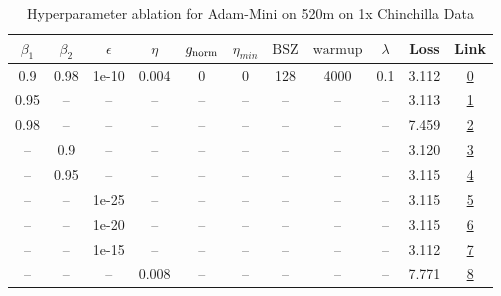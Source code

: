 \begin{table}[H]
\centering
\caption{Hyperparameter ablation for Adam-Mini on 520m on 1x Chinchilla Data}
\label{tab:ablation_adam-mini_520m_on_1x_chinchilla_data}
\begin{tabular}{ccccccccccc}
\toprule
$\beta_1$ & $\beta_2$ & $\epsilon$ & $\eta$ & $g_{\mathrm{norm}}$ & $\eta_{min}$ & $\mathrm{BSZ}$ & $\mathrm{warmup}$ & $\lambda$ & Loss & Link \\
\midrule
0.9 & 0.98 & 1e-10 & 0.004 & 0 & 0 & 128 & 4000 & 0.1 & 3.112 & \href{https://wandb.ai/marin-community/optimizer-scaling/runs/sweep-520m-10B-mini9187d7lr0.004-wd0.1-minlr0-warmup4000-b10.9-b-398e5f}{0} \\
\midrule
0.95 & -- & -- & -- & -- & -- & -- & -- & -- & 3.113 & \href{https://wandb.ai/marin-community/optimizer-scaling/runs/sweep-520m-10B-minic83515lr0.004-wd0.1-minlr0-warmup4000-b10.95--2b99be}{1} \\
0.98 & -- & -- & -- & -- & -- & -- & -- & -- & 7.459 & \href{https://wandb.ai/marin-community/optimizer-scaling/runs/sweep-520m-10B-mini61f7e6lr0.004-wd0.1-minlr0-warmup4000-b10.98--c8aa3c}{2} \\
-- & 0.9 & -- & -- & -- & -- & -- & -- & -- & 3.120 & \href{https://wandb.ai/marin-community/optimizer-scaling/runs/sweep-520m-10B-minib059b0lr0.004-wd0.1-minlr0-warmup4000-b10.9-b-ef048a}{3} \\
-- & 0.95 & -- & -- & -- & -- & -- & -- & -- & 3.115 & \href{https://wandb.ai/marin-community/optimizer-scaling/runs/sweep-520m-10B-minid80005lr0.004-wd0.1-minlr0-warmup4000-b10.9-b-4d59a5}{4} \\
-- & -- & 1e-25 & -- & -- & -- & -- & -- & -- & 3.115 & \href{https://wandb.ai/marin-community/optimizer-scaling/runs/sweep-520m-10B-mini030aa2lr0.004-wd0.1-minlr0-warmup4000-b10.9-b-e031a9}{5} \\
-- & -- & 1e-20 & -- & -- & -- & -- & -- & -- & 3.115 & \href{https://wandb.ai/marin-community/optimizer-scaling/runs/sweep-520m-10B-miniad4882lr0.004-wd0.1-minlr0-warmup4000-b10.9-b-375106}{6} \\
-- & -- & 1e-15 & -- & -- & -- & -- & -- & -- & 3.112 & \href{https://wandb.ai/marin-community/optimizer-scaling/runs/sweep-520m-10B-minica5e495lr0.004-wd0.1-minlr0-warmup4000-b10.9--791457}{7} \\
-- & -- & -- & 0.008 & -- & -- & -- & -- & -- & 7.771 & \href{https://wandb.ai/marin-community/optimizer-scaling/runs/sweep-520m-10B-mini8213c6lr0.008-wd0.1-minlr0-warmup4000-b10.9-b-cea98b}{8} \\

\end{tabular}
\end{table}
